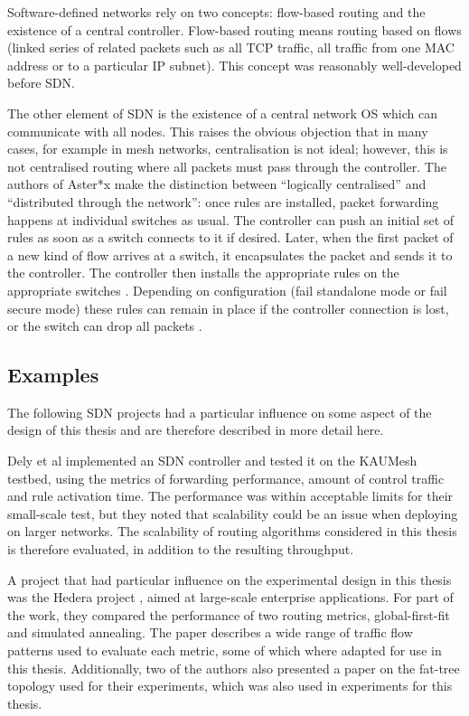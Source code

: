 Software-defined networks rely on two concepts: flow-based routing and the existence of a central controller. Flow-based routing means routing based on flows (linked series of related packets such as all TCP traffic, all traffic from one MAC address or to a particular IP subnet). This concept was reasonably well-developed \cite{wellons:oblivious,wang:routing} before SDN.

The other element of SDN is the existence of a central network OS which can communicate with all nodes. This raises the obvious objection that in many cases, for example in mesh networks, centralisation is not ideal; however, this is not centralised routing where all packets must pass through the controller. The authors of Aster*x \cite{handigol:asterix} make the distinction between ``logically centralised'' and ``distributed through the network'': once rules are installed, packet forwarding happens at individual switches as usual. The controller can push an initial set of rules as soon as a switch connects to it if desired. Later, when the first packet of a new kind of flow arrives at a switch, it encapsulates the packet and sends it to the controller. The controller then installs the appropriate rules on the appropriate switches \cite{mckeown:sdn}. Depending on configuration (fail standalone mode or fail secure mode) these rules can remain in place if the controller connection is lost, or the switch can drop all packets \cite{onf:switch140}.

\subsection{Examples}
The following SDN projects had a particular influence on some aspect of the design of this thesis and are therefore described in more detail here.

Dely et al \cite{dely:wmn} implemented an SDN controller and tested it on the KAUMesh testbed, using the metrics of forwarding performance, amount of control traffic and rule activation time. The performance was within acceptable limits for their small-scale test, but they noted that scalability could be an issue when deploying on larger networks. The scalability of routing algorithms considered in this thesis is therefore evaluated, in addition to the resulting throughput.

A project that had particular influence on the experimental design in this thesis was the Hedera project \cite{alfares:hedera}, aimed at large-scale enterprise applications. For part of the work, they compared the performance of two routing metrics, global-first-fit and simulated annealing. The paper describes a wide range of traffic flow patterns used to evaluate each metric, some of which where adapted for use in this thesis. Additionally, two of the authors also presented a paper \cite{alfares:fattree} on the fat-tree topology used for their experiments, which was also used in experiments for this thesis.


